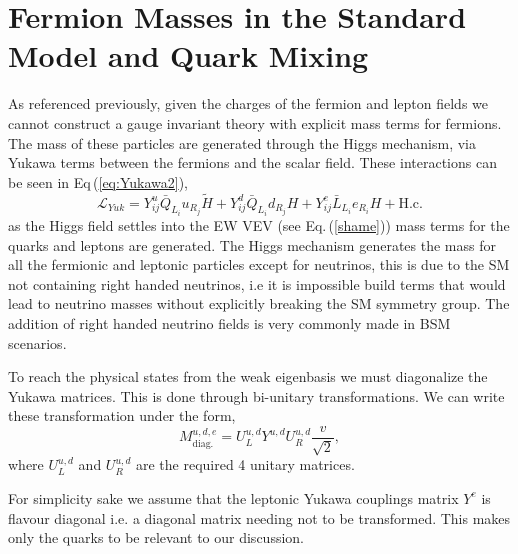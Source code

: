 \renewcommand{\cleardoublepage}{}
\renewcommand{\clearpage}{}

\section{Fermion Masses in the Standard Model and Quark Mixing}
\label{Chap_1_Sec_3}

As referenced previously, given the charges of the fermion and lepton fields we cannot construct a gauge invariant theory with explicit mass terms for fermions. 
%
The mass of these particles are generated through the Higgs mechanism, via Yukawa terms between the fermions and the scalar field. 
%
These interactions can be seen in Eq\,(\ref{eq:Yukawa2}), 
%
\begin{equation} 
\label{eq:Yukawa2}
\mathcal{L}_{Yuk} = Y^u_{ij} \bar{Q}_{L_i} u_{R_j}  \tilde{H} + Y^d_{ij} \bar{Q}_{L_i}  d_{R_j} H  + Y^e_{ij} \bar{L}_{L_i}  e_{R_i} H + \text{H.c.} 
\end{equation} 
%
as the Higgs field settles into the EW VEV (see Eq.\,(\ref{shame})) mass terms for the quarks and leptons are generated. 
%
The Higgs mechanism generates the mass for all the fermionic and leptonic particles except for neutrinos, this is due to the SM not containing right handed neutrinos, i.e it is impossible build terms that would lead to neutrino masses without explicitly breaking the SM symmetry group.
% 
The addition of right handed neutrino fields is very commonly made in BSM scenarios. 

To reach the physical states from the weak eigenbasis we must diagonalize the Yukawa matrices. This is done through bi-unitary transformations. 
% 
We can write these transformation under the form,
%
\begin{equation}
\label{YukawaMasses} 
M^{u,d,e}_{\text{diag.}}= U^{u,d}_L Y^{u,d} U^{u,d}_R \frac{v}{\sqrt{2}} , 
\end{equation} 
%
where $U^{u,d}_L$ and $U^{u,d}_R$ are the required 4 unitary matrices. 

%
%
For simplicity sake we assume that the leptonic Yukawa couplings matrix $Y^{e}$ is flavour diagonal i.e. a diagonal matrix needing not to be transformed. This makes only the quarks to be relevant to our discussion.  

